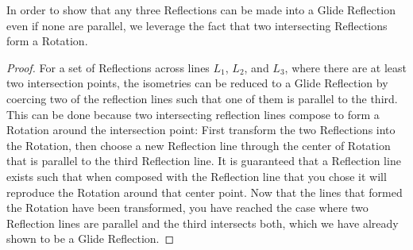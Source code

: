 \documentclass[11pt]{article}
\theoremstyle{definition}
\begin{document}
In order to show that any three Reflections can be made into a Glide
Reflection even if none are parallel, we leverage the fact that two
intersecting Reflections form a Rotation.

\begin{proof}
  For a set of Reflections across lines $L_{1}$, $L_{2}$, and $L_{3}$, where
  there are at least two intersection points, the isometries can be reduced to
  a Glide Reflection by coercing two of the reflection lines such that one of
  them is parallel to the third. This can be done because two intersecting
  reflection lines compose to form a Rotation around the intersection point:
  First transform the two Reflections into the Rotation, then choose a new
  Reflection line through the center of Rotation that is parallel to the third
  Reflection line. It is guaranteed that a Reflection line exists such that
  when composed with the Reflection line that you chose it will reproduce the
  Rotation around that center point. Now that the lines that formed the
  Rotation have been transformed, you have reached the case where two
  Reflection lines are parallel and the third intersects both, which we have
  already shown to be a Glide Reflection.
\end{proof}
\end{document}
